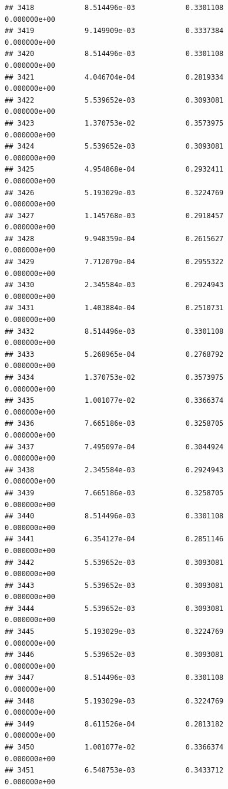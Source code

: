 \documentclass[
]{article}
\begin{document}
\begin{verbatim}
## 3418            8.514496e-03            0.3301108            0.000000e+00
## 3419            9.149909e-03            0.3337384            0.000000e+00
## 3420            8.514496e-03            0.3301108            0.000000e+00
## 3421            4.046704e-04            0.2819334            0.000000e+00
## 3422            5.539652e-03            0.3093081            0.000000e+00
## 3423            1.370753e-02            0.3573975            0.000000e+00
## 3424            5.539652e-03            0.3093081            0.000000e+00
## 3425            4.954868e-04            0.2932411            0.000000e+00
## 3426            5.193029e-03            0.3224769            0.000000e+00
## 3427            1.145768e-03            0.2918457            0.000000e+00
## 3428            9.948359e-04            0.2615627            0.000000e+00
## 3429            7.712079e-04            0.2955322            0.000000e+00
## 3430            2.345584e-03            0.2924943            0.000000e+00
## 3431            1.403884e-04            0.2510731            0.000000e+00
## 3432            8.514496e-03            0.3301108            0.000000e+00
## 3433            5.268965e-04            0.2768792            0.000000e+00
## 3434            1.370753e-02            0.3573975            0.000000e+00
## 3435            1.001077e-02            0.3366374            0.000000e+00
## 3436            7.665186e-03            0.3258705            0.000000e+00
## 3437            7.495097e-04            0.3044924            0.000000e+00
## 3438            2.345584e-03            0.2924943            0.000000e+00
## 3439            7.665186e-03            0.3258705            0.000000e+00
## 3440            8.514496e-03            0.3301108            0.000000e+00
## 3441            6.354127e-04            0.2851146            0.000000e+00
## 3442            5.539652e-03            0.3093081            0.000000e+00
## 3443            5.539652e-03            0.3093081            0.000000e+00
## 3444            5.539652e-03            0.3093081            0.000000e+00
## 3445            5.193029e-03            0.3224769            0.000000e+00
## 3446            5.539652e-03            0.3093081            0.000000e+00
## 3447            8.514496e-03            0.3301108            0.000000e+00
## 3448            5.193029e-03            0.3224769            0.000000e+00
## 3449            8.611526e-04            0.2813182            0.000000e+00
## 3450            1.001077e-02            0.3366374            0.000000e+00
## 3451            6.548753e-03            0.3433712            0.000000e+00

\end{verbatim}
\end{document}
